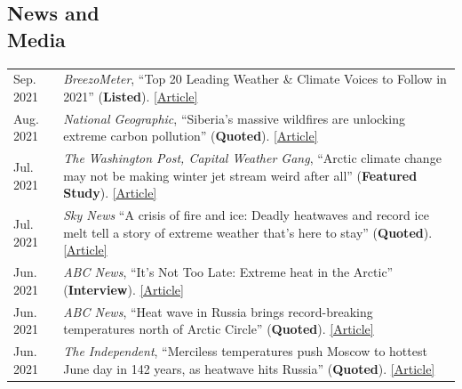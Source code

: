 \documentclass[margin,line,palatino,courier,10pt]{res}
\begin{document}
\begin{resume}
\section{\sc \textcolor{Cerulean}{\large{\textbf{News and\\ Media}}}}
\vspace*{0.04in}
\begin{tabular}{@{}p{0.9in}p{4in}}
Sep. 2021 & \textit{BreezoMeter}, ``Top 20 Leading Weather \& Climate Voices to Follow in 2021'' (\textbf{Listed}). \href{https://blog.breezometer.com/leading-weather-climate-voices-to-follow}{[Article]}\\
Aug. 2021 & \textit{National Geographic}, ``Siberia’s massive wildfires are unlocking extreme carbon pollution'' (\textbf{Quoted}). \href{https://www.nationalgeographic.com/environment/article/siberias-massive-wildfires-are-unlocking-extreme-carbon-pollution}{[Article]}\\
Jul. 2021 & \textit{The Washington Post, Capital Weather Gang}, ``Arctic climate change may not be making winter jet stream weird after all'' (\textbf{Featured Study}). \href{https://www.washingtonpost.com/weather/2021/07/31/arctic-climate-change-jetstream-winter/}{[Article]}\\
Jul. 2021 & \textit{Sky News} ``A crisis of fire and ice: Deadly heatwaves and record ice melt tell a story of extreme weather that’s here to stay'' (\textbf{Quoted}). \href{https://news.sky.com/story/climate-change-as-fire-rages-across-the-us-and-canada-ice-retreats-off-the-coast-of-siberia-12359277}{[Article]}\\
Jun. 2021 & \textit{ABC News}, ``It’s Not Too Late: Extreme heat in the Arctic'' (\textbf{Interview}). \href{https://abcnews.go.com/International/video/late-extreme-heat-arctic-78501037}{[Article]}\\
Jun. 2021 & \textit{ABC News}, ``Heat wave in Russia brings record-breaking temperatures north of Arctic Circle'' (\textbf{Quoted}). \href{https://abcnews.go.com/International/heat-wave-russia-brings-record-breaking-temperatures-north/story?id=78446355}{[Article]}\\
Jun. 2021 & \textit{The Independent}, ``Merciless temperatures push Moscow to hottest June day in 142 years, as heatwave hits Russia'' (\textbf{Quoted}). \href{https://www.independent.co.uk/climate-change/news/moscow-record-temperature-arctic-heatwave-b1871351.html}{[Article]}\\
\end{tabular}
\begin{tabular}{@{}p{0.9in}p{4in}}

\end{tabular}
\end{resume}
\end{document}

